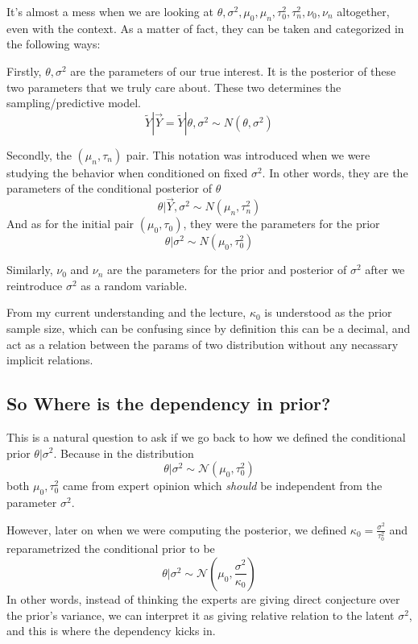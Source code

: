 It's almost a mess when we are looking at $\theta, \sigma^2, \mu_0, \mu_n, \tau_0^2, \tau_n^2, \nu_0, \nu_n$ altogether, even with the context. As a matter of fact, they can be taken and categorized in the following ways:

Firstly, $\theta, \sigma^2$ are the parameters of our true interest. It is the posterior of these two parameters that we truly care about. These two determines the sampling/predictive model. 
\begin{equation*}
    \tilde{Y} | \vec{Y} = \tilde{Y} | \theta, \sigma^2 \sim N(\theta, \sigma^2)
\end{equation*}

Secondly, the $(\mu_n, \tau_n)$ pair. This notation was introduced when we were studying the behavior when conditioned on fixed $\sigma^2$. In other words, they are the parameters of the conditional posterior of $\theta$
\begin{equation*}
    \theta | \vec{Y}, \sigma^2 \sim N(\mu_n, \tau_n^2)
\end{equation*}
And as for the initial pair $(\mu_0, \tau_0)$, they were the parameters for the prior
\begin{equation*}
    \theta | \sigma^2 \sim N(\mu_0, \tau_0^2)
\end{equation*}

Similarly, $\nu_0$ and $\nu_n$ are the parameters for the prior and posterior of $\sigma^2$ after we reintroduce $\sigma^2$ as a random variable. 

From my current understanding and the lecture, $\kappa_0$ is understood as the prior sample size, which can be confusing since by definition this can be a decimal, and act as a relation between the params of two distribution without any necassary implicit relations.

\subsection*{So Where is the dependency in prior?}
This is a natural question to ask if we go back to how we defined the conditional prior $\theta | \sigma^2$. Because in the distribution
\begin{equation*}
    \theta | \sigma^2 \sim \mathcal{N}(\mu_0, \tau_0^2)
\end{equation*}
both $\mu_0, \tau_0^2$ came from expert opinion which \emph{should} be independent from the parameter $\sigma^2$. 

However, later on when we were computing the posterior, we defined $\kappa_0 = \frac{\sigma^2}{\tau_0^2}$ and reparametrized the conditional prior to be
\begin{equation*}
    \theta | \sigma^2 \sim \mathcal{N}(\mu_0, \frac{\sigma^2}{\kappa_0})
\end{equation*}
In other words, instead of thinking the experts are giving direct conjecture over the prior's variance, we can interpret it as giving relative relation to the latent $\sigma^2$, and this is where the dependency kicks in. 


